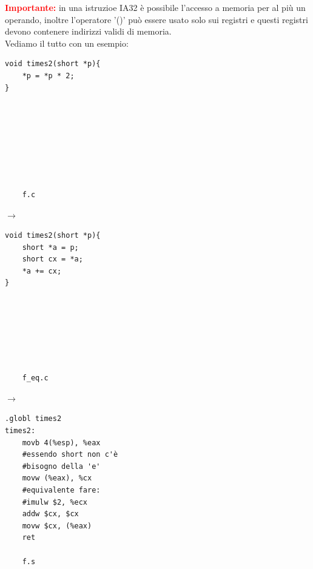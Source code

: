 \noindent \textcolor{red}{\textbf{Importante:}} in una istruzioe IA32 è possibile l'accesso a memoria per al più un operando, inoltre l'operatore '()' può essere usato solo sui registri e questi registri devono contenere indirizzi validi di memoria. \\
Vediamo il tutto con un esempio: \medskip \\
\begin{minipage}{0.2\textwidth}
    \begin{verbatim}
void times2(short *p){
    *p = *p * 2;
}








    f.c
    \end{verbatim}
\end{minipage}
\hfill
$\longrightarrow$
\hfill
\begin{minipage}{0.2\textwidth}
    \begin{verbatim}
void times2(short *p){
    short *a = p;
    short cx = *a;
    *a += cx;
}







    f_eq.c
    \end{verbatim}
\end{minipage}
\hfill
$\longrightarrow$
\hfill
\begin{minipage}{0.2\textwidth}
    \begin{verbatim}
.globl times2
times2:
    movb 4(%esp), %eax
    #essendo short non c'è
    #bisogno della 'e'
    movw (%eax), %cx
    #equivalente fare:
    #imulw $2, %ecx
    addw $cx, $cx
    movw $cx, (%eax)
    ret

    f.s
    \end{verbatim}
\end{minipage}\medskip \\
